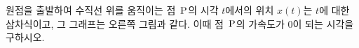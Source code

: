 \noindent\begin{minipage}[t]{0.58\linewidth}\vspace{0pt}\raggedright 원점을 출발하여 수직선 위를 움직이는 점~$\mathrm{P}$의 시각 $t$에서의 위치 $x(t)$는 $t$에 대한 삼차식이고, 그 그래프는 오른쪽 그림과 같다. 이때 점~$\mathrm{P}$의 가속도가 $0$이 되는 시각을 구하시오.\end{minipage}\hfill\begin{minipage}[t]{0.4\linewidth}\vspace{0pt}\centering \resizebox{\ifdim\width>\linewidth\linewidth\else\width\fi}{!}{}\end{minipage}\par
